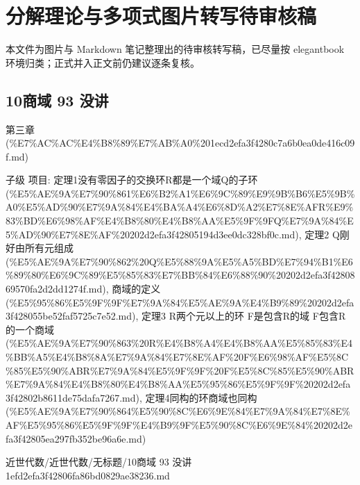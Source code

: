 \chapter{分解理论与多项式图片转写待审核稿}

\begin{dxtips}

本文件为图片与 Markdown 笔记整理出的待审核转写稿，已尽量按 elegantbook 环境归类；正式并入正文前仍建议逐条复核。

\end{dxtips}

\section*{10商域 93 没讲}

\begin{note}[来源上级主题]

第三章 (\%E7\%AC\%AC\%E4\%B8\%89\%E7\%AB\%A0\%201ecd2efa3f4280c7a6b0ea0de416c09f.md)

\end{note}

\begin{note}[10商域 93 没讲]

子级 项目: 定理1没有零因子的交换环R都是一个域Q的子环 (\%E5\%AE\%9A\%E7\%90\%861\%E6\%B2\%A1\%E6\%9C\%89\%E9\%9B\%B6\%E5\%9B\%A0\%E5\%AD\%90\%E7\%9A\%84\%E4\%BA\%A4\%E6\%8D\%A2\%E7\%8E\%AFR\%E9\%83\%BD\%E6\%98\%AF\%E4\%B8\%80\%E4\%B8\%AA\%E5\%9F\%9FQ\%E7\%9A\%84\%E5\%AD\%90\%E7\%8E\%AF\%20202d2efa3f42805194d3ee0dc328bf0c.md), 定理2 Q刚好由所有元组成 (\%E5\%AE\%9A\%E7\%90\%862\%20Q\%E5\%88\%9A\%E5\%A5\%BD\%E7\%94\%B1\%E6\%89\%80\%E6\%9C\%89\%E5\%85\%83\%E7\%BB\%84\%E6\%88\%90\%20202d2efa3f4280869570fa2d2dd1274f.md), 商域的定义 (\%E5\%95\%86\%E5\%9F\%9F\%E7\%9A\%84\%E5\%AE\%9A\%E4\%B9\%89\%20202d2efa3f428055be52faf5725c7e52.md), 定理3 R两个元以上的环  F是包含R的域 F包含R的一个商域 (\%E5\%AE\%9A\%E7\%90\%863\%20R\%E4\%B8\%A4\%E4\%B8\%AA\%E5\%85\%83\%E4\%BB\%A5\%E4\%B8\%8A\%E7\%9A\%84\%E7\%8E\%AF\%20F\%E6\%98\%AF\%E5\%8C\%85\%E5\%90\%ABR\%E7\%9A\%84\%E5\%9F\%9F\%20F\%E5\%8C\%85\%E5\%90\%ABR\%E7\%9A\%84\%E4\%B8\%80\%E4\%B8\%AA\%E5\%95\%86\%E5\%9F\%9F\%20202d2efa3f42802b8611de75dafa7267.md), 定理4同构的环商域也同构 (\%E5\%AE\%9A\%E7\%90\%864\%E5\%90\%8C\%E6\%9E\%84\%E7\%9A\%84\%E7\%8E\%AF\%E5\%95\%86\%E5\%9F\%9F\%E4\%B9\%9F\%E5\%90\%8C\%E6\%9E\%84\%20202d2efa3f42805ea297fb352be96a6e.md)

\end{note}

\begin{note}[来源路径]

近世代数/近世代数/无标题/10商域 93 没讲 1efd2efa3f42806fa86bd0829ae38236.md

\end{note}

